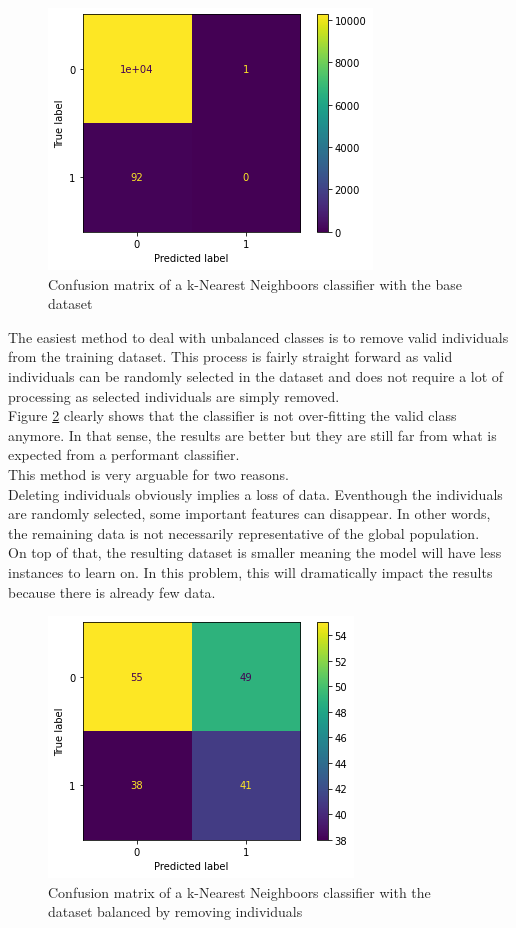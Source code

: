 \begin{figure}
    \center
    \includegraphics[scale=.5]{img/data_preparation_1.png}
    \caption{Confusion matrix of a k-Nearest Neighboors classifier with the base dataset}
    \label{data_preparation_1}
\end{figure}

The easiest method to deal with unbalanced classes is to remove valid individuals from the training dataset. This process is fairly straight forward as valid individuals can be randomly selected in the dataset and does not require a lot of processing as selected individuals are simply removed.\\
Figure \ref{data_preparation_2} clearly shows that the classifier is not over-fitting the valid class anymore. In that sense, the results are better but they are still far from what is expected from a performant classifier.\\
This method is very arguable for two reasons.\\
Deleting individuals obviously implies a loss of data. Eventhough the individuals are randomly selected, some important features can disappear. In other words, the remaining data is not necessarily representative of the global population.\\
On top of that, the resulting dataset is smaller meaning the model will have less instances to learn on. In this problem, this will dramatically impact the results because there is already few data.\\

\begin{figure}
    \center
    \includegraphics[scale=.5]{img/data_preparation_2.png}
    \caption{Confusion matrix of a k-Nearest Neighboors classifier with the dataset balanced by removing individuals}
    \label{data_preparation_2}
\end{figure}

